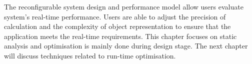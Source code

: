 The reconfigurable system design and performance model allow users evaluate system's real-time performance.
Users are able to adjust the precision of calculation and the complexity of object representation to ensure that the application meets the real-time requirements.
This chapter focuses on static analysis and optimisation is mainly done during design stage.
The next chapter will discuss techniques related to run-time optimisation.
